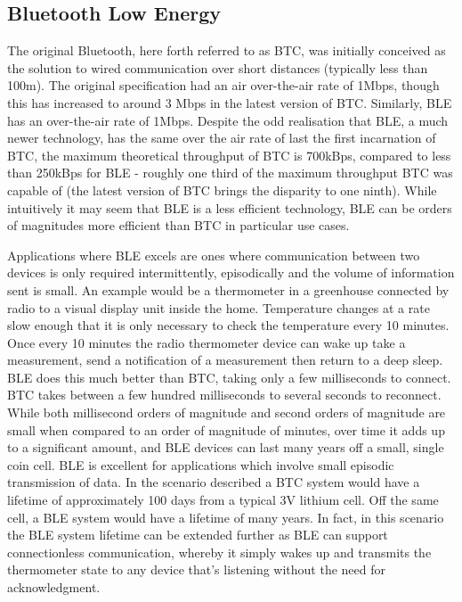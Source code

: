 \documentclass[]{article}
\begin{document}
\subsection{Bluetooth Low Energy}
The original Bluetooth, here forth referred to as \ac{BTC}, was initially conceived as the solution to wired communication over short distances (typically less than 100m). The original specification had an air over-the-air rate of 1Mbps, though this has increased to around 3 Mbps in the latest version of \ac{BTC}. Similarly, BLE has an over-the-air rate of 1Mbps. Despite the odd realisation that \ac{BLE}, a much newer technology, has the same over the air rate of last the first incarnation of \ac{BTC}, the maximum theoretical throughput of \ac{BTC} is 700kBps, compared to less than 250kBps for \ac{BLE} - roughly one third of the maximum throughput \ac{BTC} was capable of (the latest version of \ac{BTC} brings the disparity to one ninth). While intuitively it may seem that \ac{BLE} is a less efficient technology, \ac{BLE} can be orders of magnitudes more efficient than \ac{BTC} in particular use cases.

Applications where \ac{BLE} excels  are ones where communication between two devices is only required intermittently, episodically and the volume of information sent is small. An example would be a thermometer in a greenhouse connected by radio to a visual display unit inside the home. Temperature changes at a rate slow enough that it is only necessary to check the temperature every 10 minutes. Once every 10 minutes the radio thermometer device can wake up take a measurement, send a notification of a measurement then return to a deep sleep. \ac{BLE} does this much better than \ac{BTC}, taking only a few milliseconds to connect. \ac{BTC} takes between a few hundred milliseconds to several seconds to reconnect. While both millisecond orders of magnitude and second orders of magnitude are small when compared to an order of magnitude of minutes, over time it adds up to a significant amount, and \ac{BLE} devices can last many years off a small, single coin cell. \ac{BLE} is excellent for applications which involve small episodic transmission of data. In the scenario described a \ac{BTC} system would have a lifetime of approximately 100 days from a typical 3V lithium cell. Off the same cell, a \ac{BLE} system would have a lifetime of many years. In fact, in this scenario the \ac{BLE} system lifetime can be extended further as \ac{BLE} can support connectionless communication, whereby it simply wakes up and transmits the thermometer state to any device that's listening without the need for acknowledgment. 
\end{document}

